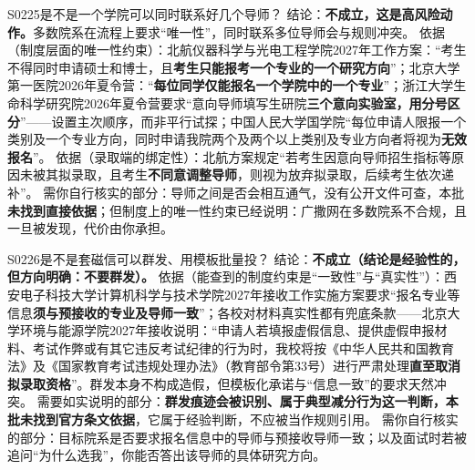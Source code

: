 \begin{qa}{S0225}{是不是一个学院可以同时联系好几个导师？}
结论：\textbf{不成立，这是高风险动作。}多数院系在流程上要求“唯一性”，同时联系多位导师会与规则冲突。
依据（制度层面的唯一性约束）：北航仪器科学与光电工程学院2027年工作方案：“考生不得同时申请硕士和博士，且\textbf{考生只能报考一个专业的一个研究方向}”；北京大学第一医院2026年夏令营：“\textbf{每位同学仅能报名一个学院中的一个专业}”；浙江大学生命科学研究院2026年夏令营要求“意向导师填写生研院\textbf{三个意向实验室，用分号区分}”——设置主次顺序，而非平行试探；中国人民大学国学院“每位申请人限报一个类别及一个专业方向，同时申请我院两个及两个以上类别及专业方向者将视为\textbf{无效报名}”。
依据（录取端的绑定性）：北航方案规定“若考生因意向导师招生指标等原因未被其拟录取，且考生\textbf{不同意调整导师}，则视为放弃拟录取，后续考生依次递补”。
需你自行核实的部分：导师之间是否会相互通气，没有公开文件可查，本批\textbf{未找到直接依据}；但制度上的唯一性约束已经说明：广撒网在多数院系不合规，且一旦被发现，代价由你承担。
\end{qa}

\begin{qa}{S0226}{是不是套磁信可以群发、用模板批量投？}
结论：\textbf{不成立（结论是经验性的，但方向明确：不要群发）。}
依据（能查到的制度约束是“一致性”与“真实性”）：西安电子科技大学计算机科学与技术学院2027年接收工作实施方案要求“报名专业等信息\textbf{须与预接收的专业及导师一致}”；各校对材料真实性都有兜底条款——北京大学环境与能源学院2027年接收说明：“申请人若填报虚假信息、提供虚假申报材料、考试作弊或有其它违反考试纪律的行为时，我校将按《中华人民共和国教育法》及《国家教育考试违规处理办法》（教育部令第33号）进行严肃处理\textbf{直至取消拟录取资格}”。群发本身不构成造假，但模板化承诺与“信息一致”的要求天然冲突。
需要如实说明的部分：\textbf{群发痕迹会被识别、属于典型减分行为这一判断，本批未找到官方条文依据}，它属于经验判断，不应被当作规则引用。
需你自行核实的部分：目标院系是否要求报名信息中的导师与预接收导师一致；以及面试时若被追问“为什么选我”，你能否答出该导师的具体研究方向。
\end{qa}

